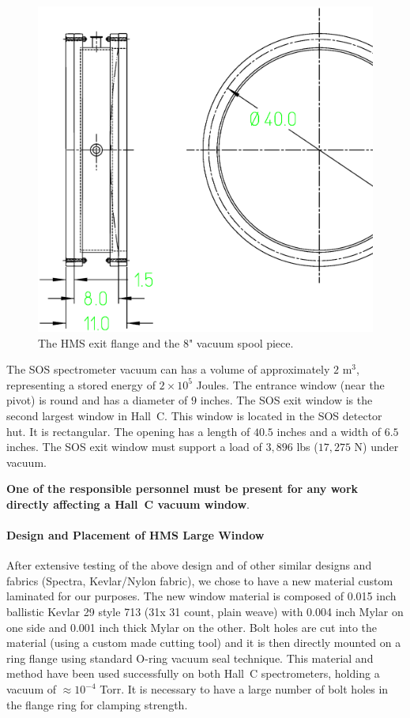 \begin{figure}
\includegraphics[width=6in]{figHMSflange.eps}
\caption{The HMS exit flange and the 8" vacuum spool piece. \label{fig:hms_flange}}
\end{figure}

The SOS spectrometer vacuum can has a volume of approximately $2$ m$^3$,
representing a stored energy of $2 \times 10^5$ Joules. The entrance
window (near the pivot) is round and has a diameter of $9$ inches.
The SOS exit window is the second largest window in Hall~C. This
window is located in the SOS detector hut. It is rectangular.
The opening has a length of $40.5$ inches and a width of $6.5$ inches.
The SOS exit
window must support a load of $3,896$ lbs ($17,275$ N) under vacuum.

{\bf One of the responsible personnel must be present for
any work directly affecting a Hall~C vacuum window}.

\paragraph{Design and Placement of HMS Large Window}

After extensive testing of the above design
and of other similar designs and fabrics (Spectra, Kevlar/Nylon fabric),
we chose to have a new
material custom laminated for our purposes. The new window material is
composed of 0.015 inch ballistic Kevlar 29 style 713 (31x 31 count,
plain weave)
with 0.004 inch Mylar on
one side
and 0.001 inch thick Mylar on the other. Bolt holes are cut into the material
(using a custom made cutting tool) and it is then directly
mounted on a ring flange using standard O-ring vacuum
seal technique.  This material and
method have
been used successfully on both Hall~C spectrometers, holding a vacuum of
$\approx 10^{-4}$ Torr. It is necessary to have a large number of bolt holes in the flange ring
for clamping strength.

